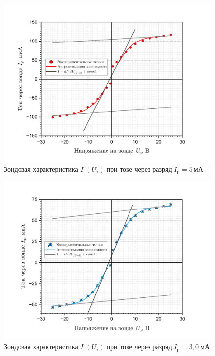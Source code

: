 \documentclass[a4paper, 12pt]{article}
\begin{document}
    \begin{figure}[H]
        \centering
        \includegraphics[width = 14 cm]{images/graph_5mA.png}
        \caption{Зондовая характеристика $I_{\text{з}}\left(U_{\text{з}}\right)$ при токе через разряд $I_{\text{р}}= 5 ~\text{мА}$}
            \label{graph:probes_5}
    \end{figure}

    \begin{figure}[H]
        \centering
        \includegraphics[width = 14 cm]{images/graph_3mA.png}
        \caption{Зондовая характеристика $I_{\text{з}}\left(U_{\text{з}}\right)$ при токе через разряд $I_{\text{р}}=3,0~\text{мА}$}
            \label{graph:probes_3}
    \end{figure}
\end{document}

